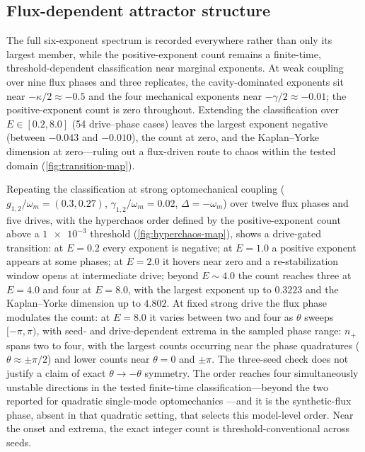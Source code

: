 \documentclass[Phys]{SciPost}
\begin{document}
\subsection{Flux-dependent attractor structure}

The full six-exponent spectrum is recorded everywhere rather than only its largest member, while the positive-exponent count remains a finite-time, threshold-dependent classification near marginal exponents. At weak coupling over nine flux phases and three replicates, the cavity-dominated exponents sit near $-\kappa/2\approx\num{-0.5}$ and the four mechanical exponents near $-\gamma/2\approx\num{-0.01}$; the positive-exponent count is zero throughout. Extending the classification over $E\in[\num{0.2},\num{8.0}]$ (54 drive--phase cases) leaves the largest exponent negative (between $\num{-0.043}$ and $\num{-0.010}$), the count at zero, and the Kaplan--Yorke dimension at zero---ruling out a flux-driven route to chaos within the tested domain (\cref{fig:transition-map}).

Repeating the classification at strong optomechanical coupling ($g_{1,2}/\omega_m=(\num{0.3},\num{0.27})$, $\gamma_{1,2}/\omega_m=\num{0.02}$, $\Delta=-\omega_m$) over twelve flux phases and five drives, with the hyperchaos order defined by the positive-exponent count above a $\num{1e-3}$ threshold (\cref{fig:hyperchaos-map}), shows a drive-gated transition: at $E=\num{0.2}$ every exponent is negative; at $E=\num{1.0}$ a positive exponent appears at some phases; at $E=\num{2.0}$ it hovers near zero and a re-stabilization window opens at intermediate drive; beyond $E\sim\num{4.0}$ the count reaches three at $E=\num{4.0}$ and four at $E=\num{8.0}$, with the largest exponent up to $\num{0.3223}$ and the Kaplan--Yorke dimension up to $\num{4.802}$. At fixed strong drive the flux phase modulates the count: at $E=\num{8.0}$ it varies between two and four as $\theta$ sweeps $[-\pi,\pi)$, with seed- and drive-dependent extrema in the sampled phase range: $n_+$ spans two to four, with the largest counts occurring near the phase quadratures ($\theta\approx\pm\pi/2$) and lower counts near $\theta=0$ and $\pm\pi$. The three-seed check does not justify a claim of exact $\theta\to-\theta$ symmetry. The order reaches four simultaneously unstable directions in the tested finite-time classification---beyond the two reported for quadratic single-mode optomechanics \cite{HalefShomroni2025}---and it is the synthetic-flux phase, absent in that quadratic setting, that selects this model-level order. Near the onset and extrema, the exact integer count is threshold-conventional across seeds.
\end{document}
